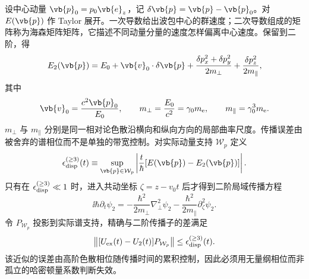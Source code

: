 设中心动量 $\vb{p}_0=p_0\vb{e}_z$，记 $\delta\vb{p}=\vb{p}-\vb{p}_0$。对 $E(\vb{p})$ 作 Taylor 展开。一次导数给出波包中心的群速度；二次导数组成的矩阵称为海森矩阵矩阵，它描述不同动量分量的速度怎样偏离中心速度。保留到二阶，得
\begin{equation*}
E_2(\vb{p})
=E_0+\vb{v}_0\cdot\delta\vb{p}
+\frac{\delta p_x^2+\delta p_y^2}{2m_\perp}
+\frac{\delta p_z^2}{2m_\parallel},
\end{equation*}
其中
\begin{equation*}
\vb{v}_0=\frac{c^2\vb{p}_0}{E_0},
\qquad
m_\perp=\frac{E_0}{c^2}=\gamma_0m_{\mathrm e},
\qquad
m_\parallel=\gamma_0^3m_{\mathrm e}.
\end{equation*}
$m_\perp$ 与 $m_\parallel$ 分别是同一相对论色散沿横向和纵向方向的局部曲率尺度。传播误差由被舍弃的谱相位而不是单独的带宽控制。对实际动量支持 $\mathcal W_p$ 定义
\begin{equation}
{
\epsilon_{\rm disp}^{(\ge3)}(t)
\equiv
\sup_{\vb{p}\in\mathcal W_p}
\left|\frac{t}{\hbar}[E(\vb{p})-E_2(\vb{p})]\right|.}
\label{eq:dispersion_truncation_control}
\end{equation}
只有在 $\epsilon_{\rm disp}^{(\ge3)}\ll1$ 时，进入共动坐标 $\zeta=z-v_0t$ 后才得到二阶局域传播方程
\begin{equation}
{
\ii\hbar\partial_t\psi_2
=-\frac{\hbar^2}{2m_\perp}\nabla_\perp^2\psi_2
-\frac{\hbar^2}{2m_\parallel}\partial_\zeta^2\psi_2.}
\label{eq:quadratic_dispersion_local_propagation}
\end{equation}
令 $P_{\mathcal W_p}$ 投影到实际谱支持，精确与二阶传播子的差满足
\begin{equation}
{
\left\|[U_{\rm ex}(t)-U_2(t)]P_{\mathcal W_p}\right\|
\le\epsilon_{\rm disp}^{(\ge3)}(t).}
\label{eq:quadratic_dispersion_propagator_error_bound}
\end{equation}
该近似的误差由高阶色散相位随传播时间的累积控制，因此必须用无量纲相位而非孤立的哈密顿量系数判断失效。

